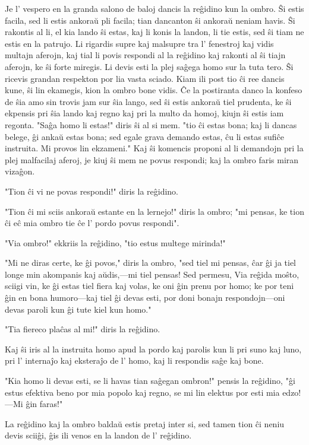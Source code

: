 \documentclass[ngerman,12pt,twoside]{book}
\begin{document}
Je l' vespero en la granda salono de baloj dancis la reĝidino kun la ombro. Ŝi estis facila, sed li estis ankoraŭ pli facila; tian dancanton ŝi ankoraŭ neniam havis. Ŝi rakontis al li, el kia lando ŝi estas, kaj li konis la landon, li tie estis, sed ŝi tiam ne estis en la patrujo. Li rigardis supre kaj malsupre tra l' fenestroj kaj vidis multajn aferojn, kaj tial li povis respondi al la reĝidino kaj rakonti al ŝi tiajn aferojn, ke ŝi forte miregis. Li devis esti la plej saĝega homo sur la tuta tero. Ŝi ricevis grandan respekton por lia vasta sciado. Kiam ili post tio ĉi ree dancis kune, ŝi lin ekamegis, kion la ombro bone vidis. Ĉe la postiranta danco la konfeso de ŝia amo sin trovis jam sur ŝia lango, sed ŝi estis ankoraŭ tiel prudenta, ke ŝi ekpensis pri ŝia lando kaj regno kaj pri la multo da homoj, kiujn ŝi estis iam regonta. "Saĝa homo li estas!" diris ŝi al si mem. "tio ĉi estas bona; kaj li dancas belege, ĝi ankaŭ estas bona; sed egale grava demando estas, ĉu li estas sufiĉe instruita. Mi provos lin ekzameni." Kaj ŝi komencis proponi al li demandojn pri la plej malfacilaj aferoj, je kiuj ŝi mem ne povus respondi; kaj la ombro faris miran vizaĝon.

"Tion ĉi vi ne povas respondi!" diris la reĝidino.

"Tion ĉi mi sciis ankoraŭ estante en la lernejo!" diris la ombro; "mi pensas, ke tion ĉi eĉ mia ombro tie ĉe l' pordo povus respondi".

"Via ombro!" ekkriis la reĝidino, "tio estus multege mirinda!"

"Mi ne diras certe, ke ĝi povos," diris la ombro, "sed tiel mi pensas, ĉar ĝi ja tiel longe min akompanis kaj aŭdis,---mi tiel pensas! Sed permesu, Via reĝida moŝto, sciigi vin, ke ĝi estas tiel fiera kaj volas, ke oni ĝin prenu por homo; ke por teni ĝin en bona humoro---kaj tiel ĝi devas esti, por doni bonajn respondojn---oni devas paroli kun ĝi tute kiel kun homo."

"Tia fiereco plaĉas al mi!" diris la reĝidino.

Kaj ŝi iris al la instruita homo apud la pordo kaj parolis kun li pri suno kaj luno, pri l' internaĵo kaj eksteraĵo de l' homo, kaj li respondis saĝe kaj bone.

"Kia homo li devas esti, se li havas tian saĝegan ombron!" pensis la reĝidino, "ĝi estus efektiva beno por mia popolo kaj regno, se mi lin elektus por esti mia edzo!---Mi ĝin faras!"

La reĝidino kaj la ombro baldaŭ estis pretaj inter si, sed tamen tion ĉi neniu devis sciiĝi, ĝis ili venos en la landon de l' reĝidino.
\end{document}
